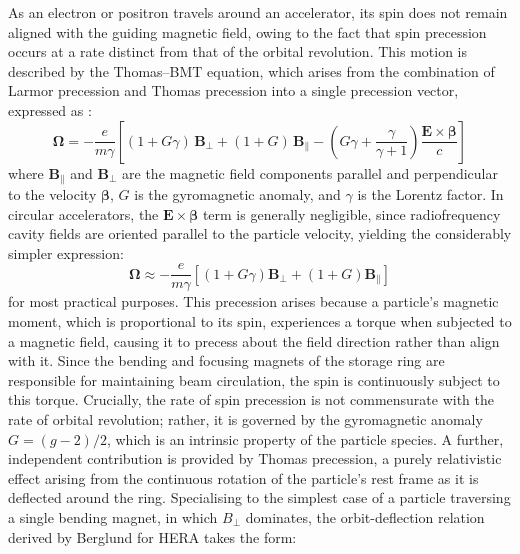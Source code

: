 \documentclass[%
 aip,
 amsmath,amssymb,
 reprint,%
superscriptaddress
]{revtex4-2}
\begin{document}
As an electron or positron travels around an accelerator, its spin does not remain aligned with the guiding magnetic field, owing to the fact that spin precession occurs at a rate distinct from that of the orbital revolution.
This motion is described by the Thomas–BMT equation\cite{bargmann_michel_telegdi_1959}, which arises from the combination of Larmor precession and Thomas precession into a single precession vector\cite{hamwi_hoffstaetter_2025}, expressed as \cite{meot_huang_ptitsyn_lin_2023}:
\begin{equation}
\boldsymbol{\Omega} = -\frac{e}{m\gamma}\left[(1+G\gamma)\,\mathbf{B}_{\perp} + (1+G)\,\mathbf{B}_{\parallel} - \left(G\gamma+\frac{\gamma}{\gamma+1}\right)\frac{\mathbf{E}\times\boldsymbol{\beta}}{c}\right]
\end{equation}
where $\mathbf{B}_\parallel$ and $\mathbf{B}_\perp$ are the magnetic field components parallel and perpendicular to the velocity $\boldsymbol{\beta}$, $G$ is the gyromagnetic anomaly, and $\gamma$ is the Lorentz factor.
In circular accelerators, the $\mathbf{E}\times\boldsymbol{\beta}$ term is generally negligible, since radiofrequency cavity fields are oriented parallel to the particle velocity, yielding the considerably simpler expression:
\begin{equation}
\boldsymbol{\Omega} \approx -\frac{e}{m\gamma}\left[(1+G\gamma)\mathbf{B}_\perp + (1+G)\mathbf{B}_\parallel\right]
\end{equation}
for most practical purposes.\cite{meot_huang_ptitsyn_lin_2023, zara_berglund_2001}
This precession arises because a particle's magnetic moment, which is proportional to its spin, experiences a torque when subjected to a magnetic field, causing it to precess about the field direction rather than align with it\cite{meot_huang_ptitsyn_lin_2023}.
Since the bending and focusing magnets of the storage ring are responsible for maintaining beam circulation, the spin is continuously subject to this torque\cite{meot_huang_ptitsyn_lin_2023}.
Crucially, the rate of spin precession is not commensurate with the rate of orbital revolution; rather, it is governed by the gyromagnetic anomaly $G=(g-2)/2$, which is an intrinsic property of the particle species\cite{bargmann_michel_telegdi_1959, meot_huang_ptitsyn_lin_2023}.
A further, independent contribution is provided by Thomas precession, a purely relativistic effect arising from the continuous rotation of the particle's rest frame as it is deflected around the ring\cite{bargmann_michel_telegdi_1959, meot_huang_ptitsyn_lin_2023}.
Specialising to the simplest case of a particle traversing a single bending magnet, in which $B_\perp$ dominates, the orbit-deflection relation derived by Berglund for HERA takes the form\cite{zara_berglund_2001}:
\end{document}
